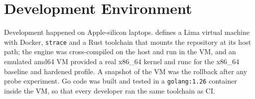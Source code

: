\section{Development Environment}

Development happened on Apple-silicon laptops.  defines a Lima virtual machine with Docker, \texttt{strace} and a Rust toolchain that mounts the repository at its host path; the engine was cross-compiled on the host and run in the VM, and an emulated amd64 VM provided a real x86\_64 kernel and runc for the x86\_64 baseline and hardened profile. A snapshot of the VM was the rollback after any probe experiment. Go code was built and tested in a \texttt{golang:1.26} container inside the VM, so that every developer ran the same toolchain as CI.

